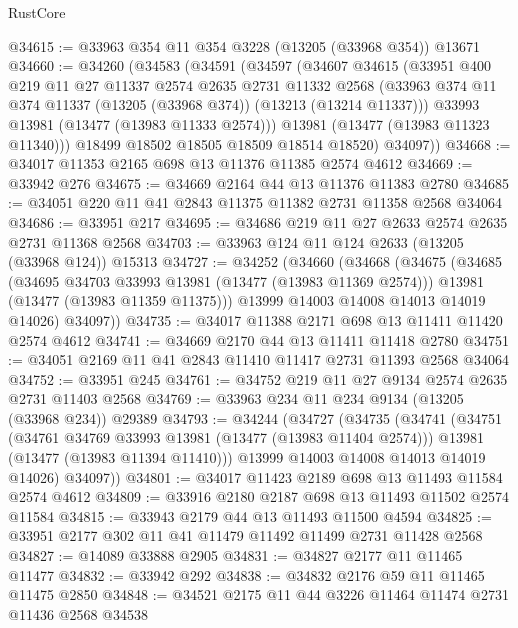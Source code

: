 \begin{lexlean}{RustCore}
\begin{coremodule}
@34615 := @33963 @354 @11 @354 @3228 (@13205 (@33968 @354)) @13671
@34660 := @34260
    (@34583
      (@34591
        (@34597
          (@34607
            @34615
            (@33951
              @400
              @219
              @11
              @27
              @11337
              @2574
              @2635
              @2731
              @11332
              @2568
              (@33963 @374 @11 @374 @11337 (@13205 (@33968 @374)) (@13213 (@13214 @11337)))
              @33993
              @13981
              (@13477 (@13983 @11333 @2574)))
            @13981
            (@13477 (@13983 @11323 @11340)))
          @18499
          @18502
          @18505
          @18509
          @18514
          @18520)
        @34097))
@34668 := @34017 @11353 @2165 @698 @13 @11376 @11385 @2574 @4612
@34669 := @33942 @276
@34675 := @34669 @2164 @44 @13 @11376 @11383 @2780
@34685 := @34051 @220 @11 @41 @2843 @11375 @11382 @2731 @11358 @2568 @34064
@34686 := @33951 @217
@34695 := @34686 @219 @11 @27 @2633 @2574 @2635 @2731 @11368 @2568
@34703 := @33963 @124 @11 @124 @2633 (@13205 (@33968 @124)) @15313
@34727 := @34252
    (@34660
      (@34668
        (@34675
          (@34685
            (@34695 @34703 @33993 @13981 (@13477 (@13983 @11369 @2574)))
            @13981
            (@13477 (@13983 @11359 @11375)))
          @13999
          @14003
          @14008
          @14013
          @14019
          @14026)
        @34097))
@34735 := @34017 @11388 @2171 @698 @13 @11411 @11420 @2574 @4612
@34741 := @34669 @2170 @44 @13 @11411 @11418 @2780
@34751 := @34051 @2169 @11 @41 @2843 @11410 @11417 @2731 @11393 @2568 @34064
@34752 := @33951 @245
@34761 := @34752 @219 @11 @27 @9134 @2574 @2635 @2731 @11403 @2568
@34769 := @33963 @234 @11 @234 @9134 (@13205 (@33968 @234)) @29389
@34793 := @34244
    (@34727
      (@34735
        (@34741
          (@34751
            (@34761 @34769 @33993 @13981 (@13477 (@13983 @11404 @2574)))
            @13981
            (@13477 (@13983 @11394 @11410)))
          @13999
          @14003
          @14008
          @14013
          @14019
          @14026)
        @34097))
@34801 := @34017 @11423 @2189 @698 @13 @11493 @11584 @2574 @4612
@34809 := @33916 @2180 @2187 @698 @13 @11493 @11502 @2574 @11584
@34815 := @33943 @2179 @44 @13 @11493 @11500 @4594
@34825 := @33951 @2177 @302 @11 @41 @11479 @11492 @11499 @2731 @11428 @2568
@34827 := @14089 @33888 @2905
@34831 := @34827 @2177 @11 @11465 @11477
@34832 := @33942 @292
@34838 := @34832 @2176 @59 @11 @11465 @11475 @2850
@34848 := @34521 @2175 @11 @44 @3226 @11464 @11474 @2731 @11436 @2568 @34538

\end{coremodule}
\end{lexlean}
